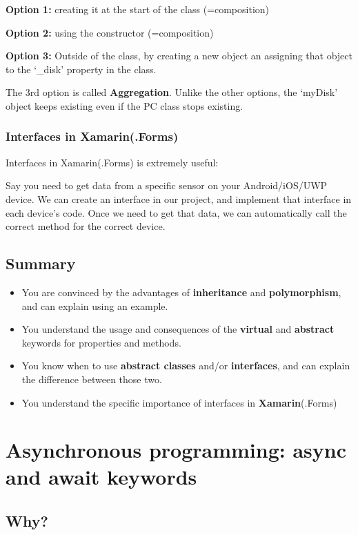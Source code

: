 \documentclass{article}
\newcommand{\bold}[1]{\textbf{#1}}
\begin{document}
\bold{Option 1:} creating it at the start of the class (=composition)

\bold{Option 2:} using the constructor (=composition)

\bold{Option 3:} Outside of the class, by creating a new object an assigning that object to the `\_disk' property in the class.

The 3rd option is called \bold{Aggregation}. Unlike the other options, the `myDisk' object keeps existing even if the PC class stops existing.

\subsubsection{Interfaces in Xamarin(.Forms)}

Interfaces in Xamarin(.Forms) is extremely useful: 

Say you need to get data from a specific sensor on your Android/iOS/UWP device. 
We can create an interface in our project, and implement that interface in each device's code.
Once we need to get that data, we can automatically call the correct method for the correct device.

\subsection{Summary}

\begin{itemize}
    \item You are convinced by the advantages of \bold{inheritance} and \bold{polymorphism}, and can explain using an example.
    \item You understand the usage and consequences of the \bold{virtual} and \bold{abstract} keywords for properties and methods.
    \item You know when to use \bold{abstract classes} and/or \bold{interfaces}, and can explain the difference between those two.
    \item You understand the specific importance of interfaces in \bold{Xamarin}(.Forms)
\end{itemize}

\section{Asynchronous programming: async and await keywords}

\subsection{Why?}
\end{document}
